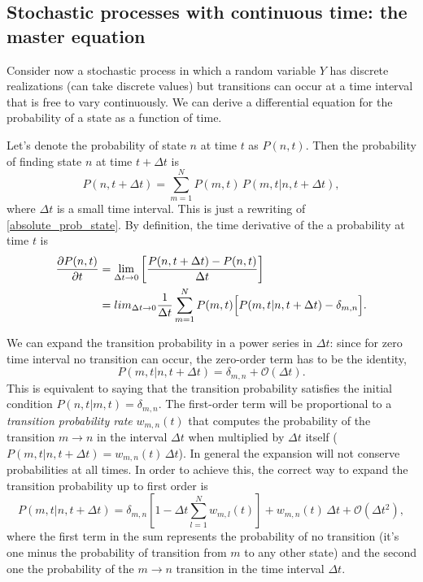 \documentclass[12pt]{article}
\numberwithin{equation}{section} %
\begin{document}
\subsection{Stochastic processes with continuous time: the master equation}
Consider now a stochastic process in which a random variable $Y$ has discrete realizations (can take discrete values) but transitions can occur at a time interval that is free to vary continuously. We can derive a differential equation for the probability of a state as a function of time.

Let's denote the probability of state $n$ at time $t$ as $P(n, t)$. Then the probability of finding state $n$ at time $t+\Delta t$ is
\begin{equation}
P(n, t+\Delta t) = \sum_{m=1}^N P(m, t)\,P(m, t |n, t+\Delta t),
\end{equation}
where $\Delta t$ is a small time interval. This is just a rewriting of \eqref{absolute_prob_state}. By definition, the time derivative of the a probability at time $t$ is
\begin{equation}
\begin{aligned}
\frac{\partial P(n, t)}{\partial t} &= \lim_{\Delta t \to 0} \left[ \frac{P(n, t+\Delta t) - P(n, t)}{\Delta t} \right]\\
&= lim_{\Delta t \to 0} \frac{1}{\Delta t} \sum_{m=1}^N P(m, t) \Bigl[ P(m, t |n, t+\Delta t) - \delta_{m,n} \Bigr].
\end{aligned}
\end{equation}

We can expand the transition probability in a power series in $\Delta t$: since for zero time interval no transition can occur, the zero-order term has to be the identity,
\begin{equation}
\label{trans_prob_derivative}
P(m, t |n, t+\Delta t) = \delta_{m,n} + \mathcal{O}\left(\Delta t\right).
\end{equation}
This is equivalent to saying that the transition probability satisfies the initial condition $P(n,t | m,t) = \delta_{m,n}$. The first-order term will be proportional to a \textit{transition probability rate} $w_{m,n}(t)$ that computes the probability of the transition $m\to n$ in the interval $\Delta t$ when multiplied by $\Delta t$ itself ($P(m, t|n, t+\Delta t) = w_{m,n}(t)\,\Delta t$). In general the expansion will not conserve probabilities at all times. In order to achieve this, the correct way to expand the transition probability up to first order is
\begin{equation}
\label{trans_prob_expansion}
P(m, t |n, t+\Delta t) = \delta_{m,n} \left[ 1 -\Delta t \sum_{l=1}^N w_{m,l}(t) \right] + w_{m,n}(t)\,\Delta t + \mathcal{O}\left(\Delta t^2\right),
\end{equation}
where the first term in the sum represents the probability of no transition (it's one minus the probability of transition from $m$ to any other state) and the second one the probability of the $m\to n$ transition in the time interval $\Delta t$.
\end{document}
